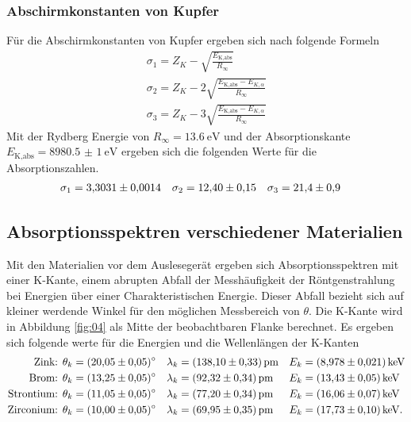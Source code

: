 \subsubsection{Abschirmkonstanten von Kupfer}
Für die Abschirmkonstanten von Kupfer ergeben sich nach \cite{man:v602} folgende Formeln
\begin{align}
    \sigma_1 = Z_K -\sqrt{\frac{E_\text{K,abs}}{R_\infty}}\\
    \sigma_2 = Z_K -2\sqrt{\frac{E_\text{K,abs}- E_{K,\alpha} }{R_\infty}}\\
    \sigma_3 = Z_K -3\sqrt{\frac{E_\text{K,abs}- E_{K,\alpha} }{R_\infty}}
\end{align}
Mit der Rydberg Energie von $R_\infty = \qty{13.6}{\eV}$ und der Absorptionskante $E_\text{K,abs} = \qty{8980.5(10)}{\eV}$ \cite{x-ray}
ergeben sich die folgenden Werte für die Absorptionszahlen.
\begin{align}
    \sigma_1 &= \num{3.3031 \pm 0.0014} &
    \sigma_2 &= \num{12.40 \pm 0.15} &
    \sigma_3 &= \num{21.4 \pm 0.9}
\end{align}







\subsection{Absorptionsspektren verschiedener Materialien}
Mit den Materialien vor dem Auslesegerät ergeben sich Absorptionsspektren mit einer K-Kante, einem abrupten Abfall
der Messhäufigkeit der Röntgenstrahlung bei Energien über einer Charakteristischen Energie.
Dieser Abfall bezieht sich auf kleiner werdende Winkel für den möglichen Messbereich von $\theta$.
Die K-Kante wird in Abbildung \ref{fig:04} als Mitte der beobachtbaren Flanke berechnet.
Es ergeben sich folgende werte für die Energien und die Wellenlängen der K-Kanten
\begin{align}
    \text{Zink:       } \theta_k &= \qty{20.05 \pm 0.05}{\degree} & \lambda_k &= \qty{138.10 \pm 0.33}{\pico\meter} & E_k &= \qty{8.978 \pm 0.021}{ \kilo\eV } \\
    \text{Brom:       } \theta_k &= \qty{13.25 \pm 0.05}{\degree} & \lambda_k &= \qty{92.32 \pm 0.34 }{\pico\meter} & E_k &= \qty{13.43 \pm 0.05 }{ \kilo\eV }\\
    \text{Strontium:  } \theta_k &= \qty{11.05 \pm 0.05}{\degree} & \lambda_k &= \qty{77.20 \pm 0.34 }{\pico\meter} & E_k &= \qty{16.06 \pm 0.07 }{ \kilo\eV }\\
    \text{Zirconium:  } \theta_k &= \qty{10.00 \pm 0.05}{\degree} & \lambda_k &= \qty{69.95 \pm 0.35 }{\pico\meter} & E_k &= \qty{17.73 \pm 0.10}{\kilo\eV}. 
    \label{eq:absorptionskanten}
\end{align}

